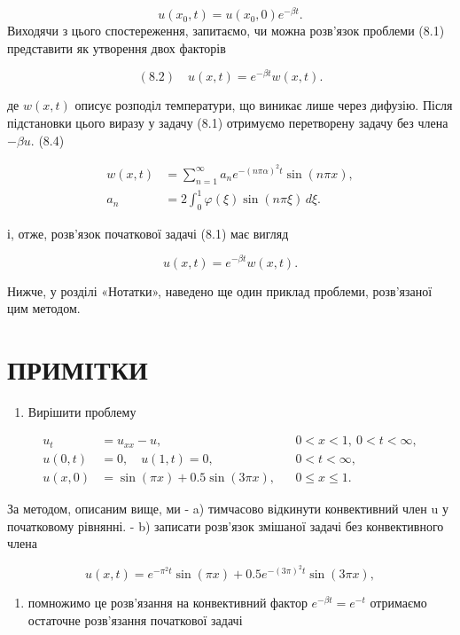 \documentclass[
  ukrainian,
]{article}
\providecommand{\tightlist}{%
  \setlength{\itemsep}{0pt}\setlength{\parskip}{0pt}}
\begin{document}
\[
u(x_0,t)=u(x_0,0)e^{-\beta t}.
\] Виходячи з цього спостереження, запитаємо, чи можна розв'язок
проблеми (8.1) представити як утворення двох факторів

\[
(8.2)\quad u(x,t)=e^{-\beta t}w(x,t).
\]

де \(w(x,t)\) описує розподіл температури, що виникає лише через
дифузію. Після підстановки цього виразу у задачу (8.1) отримуємо
перетворену задачу без члена \(-\beta u\). (8.4)

\[
\begin{aligned}
w(x,t)&=\sum_{n=1}^{\infty} a_n e^{-(n\pi\alpha)^2 t}\sin(n\pi x),\\
a_n&=2\int_0^1 \varphi(\xi)\sin(n\pi \xi)\,d\xi.
\end{aligned}
\]

і, отже, розв'язок початкової задачі (8.1) має вигляд

\[
u(x, t) = e^{-\beta t}w(x, t).
\]

Нижче, у розділі «Нотатки», наведено ще один приклад проблеми,
розв'язаної цим методом.

\section{ПРИМІТКИ}\label{ux43fux440ux438ux43cux456ux442ux43aux438}

\begin{enumerate}
\def\labelenumi{\arabic{enumi}.}
\tightlist
\item
  Вирішити проблему
\end{enumerate}

\[
\begin{aligned}
u_t &= u_{xx} - u, && 0 < x < 1,\ 0 < t < \infty, \\
u(0,t) &= 0,\quad u(1,t) = 0, && 0 < t < \infty, \\
u(x,0) &= \sin(\pi x) + 0.5\sin(3\pi x), && 0 \leqslant x \leqslant 1.
\end{aligned}
\]

За методом, описаним вище, ми - a) тимчасово відкинути конвективний член
u у початковому рівнянні. - b) записати розв'язок змішаної задачі без
конвективного члена

\[
u(x, t) = e^{-\pi^2 t} \sin(\pi x) + 0.5e^{-(3\pi)^2 t} \sin(3\pi x),
\]

\begin{enumerate}
\def\labelenumi{\alph{enumi})}
\setcounter{enumi}{2}
\tightlist
\item
  помножимо це розв'язання на конвективний фактор
  \(e^{-\beta t}=e^{-t}\) отримаємо остаточне розв'язання початкової
  задачі
\end{enumerate}
\end{document}

